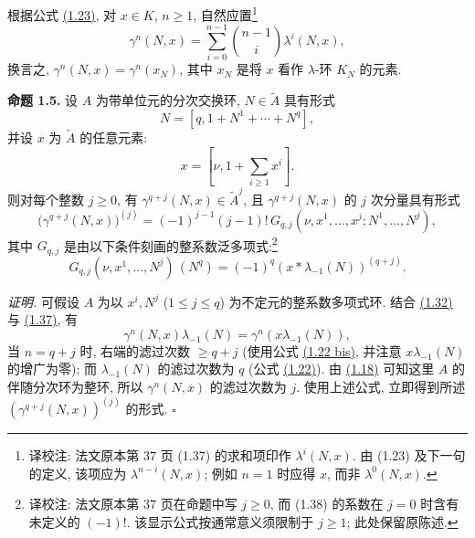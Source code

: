 根据公式 \hyperlink{sga6.e00.eq.1-23}{(1.23)}, 对 $x\in K$, $n\geq1$, 自然应置\footnote{译校注: 法文原本第 37 页 (1.37) 的求和项印作 $\lambda^i(N,x)$. 由 (1.23) 及下一句的定义, 该项应为 $\lambda^{n-i}(N,x)$; 例如 $n=1$ 时应得 $x$, 而非 $\lambda^0(N,x)$.}
\begin{equation}\tag{1.37}
\gamma^n(N,x)=\sum_{i=0}^{n-1}\binom{n-1}{i}\lambda^i(N,x),
\end{equation}
换言之, $\gamma^n(N,x)=\gamma^n(x_N)$, 其中 $x_N$ 是将 $x$ 看作 $\lambda$-环 $K_N$ 的元素.

\textbf{命题 1.5.} 设 $A$ 为带单位元的分次交换环, $N\in\widetilde A$ 具有形式
\[
N=[q,1+N^1+\cdots+N^q],
\]
并设 $x$ 为 $\widetilde A$ 的任意元素:
\[
x=[\nu,1+\sum_{i\geq 1}x^i].
\]
则对每个整数 $j\geq0$, 有 $\gamma^{q+j}(N,x)\in\widetilde A^j$, 且 $\gamma^{q+j}(N,x)$ 的 $j$ 次分量具有形式
\begin{equation}\tag{1.38}
\bigl(\gamma^{q+j}(N,x)\bigr)^{(j)}=(-1)^{j-1}(j-1)!\,G_{q,j}(\nu,x^1,\ldots,x^j;N^1,\ldots,N^j),
\end{equation}
其中 $G_{q,j}$ 是由以下条件刻画的整系数泛多项式:\footnote{译校注: 法文原本第 37 页在命题中写 $j\geq0$, 而 (1.38) 的系数在 $j=0$ 时含有未定义的 $(-1)!$. 该显示公式按通常意义须限制于 $j\geq1$; 此处保留原陈述.}
\begin{equation}\tag{1.39}
G_{q,j}(\nu,x^1,\ldots,N^j)\,(N^q)=(-1)^q(x*\lambda_{-1}(N))^{(q+j)}.
\end{equation}

\emph{证明.} 可假设 $A$ 为以 $x^i,N^j$ ($1\leq j\leq q$) 为不定元的整系数多项式环. 结合 \hyperlink{sga6.e00.eq.1-32}{(1.32)} 与 \hyperlink{sga6.e00.eq.1-37}{(1.37)}, 有
\begin{equation}\tag{1.40}
\gamma^n(N,x)\lambda_{-1}(N)=\gamma^n(x\lambda_{-1}(N)),
\end{equation}
当 $n=q+j$ 时, 右端的滤过次数 $\geq q+j$ (使用公式 \hyperlink{sga6.e00.eq.1-22bis}{(1.22 bis)}, 并注意 $x\lambda_{-1}(N)$ 的增广为零); 而 $\lambda_{-1}(N)$ 的滤过次数为 $q$ (公式 \hyperlink{sga6.e00.eq.1-22}{(1.22)}). 由 \hyperlink{sga6.e00.eq.1-18}{(1.18)} 可知这里 $A$ 的伴随分次环为整环, 所以 $\gamma^n(N,x)$ 的滤过次数为 $j$. 使用上述公式, 立即得到所述 $(\gamma^{q+j}(N,x))^{(j)}$ 的形式. \hfill$\square$

